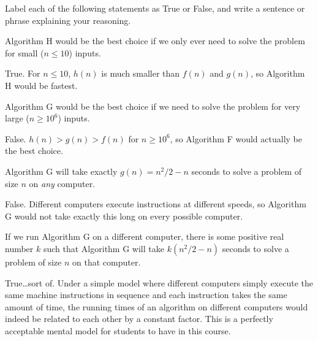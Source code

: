 \documentclass{tufte-handout}
\begin{document}
\begin{questions}
  Label each of the following statements as True or False, and write
  a sentence or phrase explaining your reasoning.
  \begin{subquestions}
    \item Algorithm H would be the best choice if we only ever need to
      solve the problem for small ($n \leq 10$) inputs.
      \begin{answer}
        True.  For $n \leq 10$, $h(n)$ is much smaller than $f(n)$ and
        $g(n)$, so Algorithm H would be fastest.
      \end{answer}
    \item Algorithm G would be the best choice if we need to solve the
      problem for very large ($n \geq 10^6$) inputs.
      \begin{answer}
        False.  $h(n) > g(n) > f(n)$ for $n \geq 10^6$, so Algorithm F
        would actually be the best choice.
      \end{answer}
    \item Algorithm G will take exactly $g(n) = n^2/2 - n$ seconds to
      solve a problem of size $n$ on \emph{any} computer.
      \begin{answer}
        False.  Different computers execute instructions at different
        speeds, so Algorithm G would not take exactly this long on
        every possible computer.
      \end{answer}
    \item If we run Algorithm G on a different computer, there is some
      positive real number $k$ such that Algorithm G will take
      $k (n^2/2 - n)$ seconds to solve a problem of size $n$ on that
      computer.
      \begin{answer}
        True\dots sort of.  Under a simple model where different
        computers simply execute the same machine instructions in
        sequence and each instruction takes the same amount of time,
        the running times of an algorithm on different computers would
        indeed be related to each other by a constant factor.  This is
        a perfectly acceptable mental model for students to have in
        this course.


\end{answer}
\end{subquestions}
\end{questions}
\end{document}
